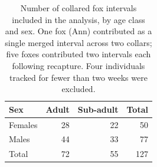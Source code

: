 
\begin{table}[t]
    \centering
    \captionsetup{font=scriptsize}
    \caption{Number of collared fox intervals included in the analysis,
        by age class and sex. One fox (Ann) contributed as a single merged interval
        across two collars; five foxes contributed two intervals each following
        recapture. Four individuals tracked for fewer than two weeks were
        excluded.}
    \label{table:capt}
    \scriptsize
    \begin{tabular}{lrr|r}
        \toprule
        Sex     & Adult & Sub-adult & Total \\
        \midrule
        Females & 28    & 22        & 50    \\
        Males   & 44    & 33        & 77    \\
        \midrule
        Total   & 72    & 55        & 127   \\
        \bottomrule
    \end{tabular}
\end{table}
